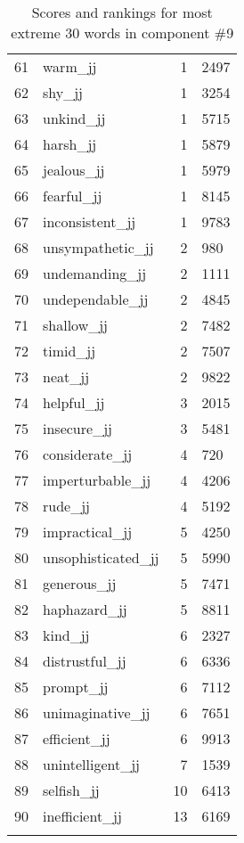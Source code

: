 \begin{longtable}[!htbp]{| rlr@{.}l |}
    61 & warm\_jj & 1 & 2497 \\
    62 & shy\_jj & 1 & 3254 \\
    63 & unkind\_jj & 1 & 5715 \\
    64 & harsh\_jj & 1 & 5879 \\
    65 & jealous\_jj & 1 & 5979 \\
    66 & fearful\_jj & 1 & 8145 \\
    67 & inconsistent\_jj & 1 & 9783 \\
    68 & unsympathetic\_jj & 2 & 980 \\
    69 & undemanding\_jj & 2 & 1111 \\
    70 & undependable\_jj & 2 & 4845 \\
    71 & shallow\_jj & 2 & 7482 \\
    72 & timid\_jj & 2 & 7507 \\
    73 & neat\_jj & 2 & 9822 \\
    74 & helpful\_jj & 3 & 2015 \\
    75 & insecure\_jj & 3 & 5481 \\
    76 & considerate\_jj & 4 & 720 \\
    77 & imperturbable\_jj & 4 & 4206 \\
    78 & rude\_jj & 4 & 5192 \\
    79 & impractical\_jj & 5 & 4250 \\
    80 & unsophisticated\_jj & 5 & 5990 \\
    81 & generous\_jj & 5 & 7471 \\
    82 & haphazard\_jj & 5 & 8811 \\
    83 & kind\_jj & 6 & 2327 \\
    84 & distrustful\_jj & 6 & 6336 \\
    85 & prompt\_jj & 6 & 7112 \\
    86 & unimaginative\_jj & 6 & 7651 \\
    87 & efficient\_jj & 6 & 9913 \\
    88 & unintelligent\_jj & 7 & 1539 \\
    89 & selfish\_jj & 10 & 6413 \\
    90 & inefficient\_jj & 13 & 6169 \\
    \hline
    \caption{Scores and rankings for most extreme 30 words in component \#9} \\
\end{longtable}
